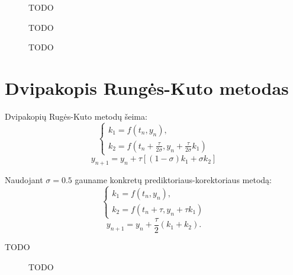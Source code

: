 \documentclass[]{VUMIFTemplateClass}
\begin{document}
\begin{figure}
    \begin{center}
        
    \end{center}
    \caption{TODO}
\end{figure}

\begin{figure}
    \begin{center}
        
    \end{center}
    \caption{TODO}
\end{figure}

\begin{figure}
    \begin{center}
        
    \end{center}
    \caption{TODO}
\end{figure}

\section{Dvipakopis Rungės-Kuto metodas}
Dvipakopių Rugės-Kuto metodų šeima:
\begin{equation}
    \begin{cases}
        k_1 = f(t_n, y_n),\\
        k_2 = f(t_n + \frac{\tau}{2 \sigma}, y_n + \frac{\tau}{2 \sigma} k_1)
    \end{cases}
\end{equation}
\[ y_{n+1} = y_n + \tau [(1 - \sigma) k_1 + \sigma k_2]\]

Naudojant $\sigma = 0.5$ gauname konkretų prediktoriaus-korektoriaus metodą:
\begin{equation}
    \begin{cases}
        k_1 = f(t_n, y_n),\\
        k_2 = f(t_n + \tau, y_n + \tau k_1)
    \end{cases}
\end{equation}
\[ y_{n+1} = y_n + \frac{\tau}{2} (k_1 + k_2). \]

\begin{table}[H]
    \begin{center}
        
    \end{center}
    \caption{TODO}
\end{table}

\begin{figure}
    \begin{center}
        
    \end{center}
    \caption{TODO}
\end{figure}
\end{document}
